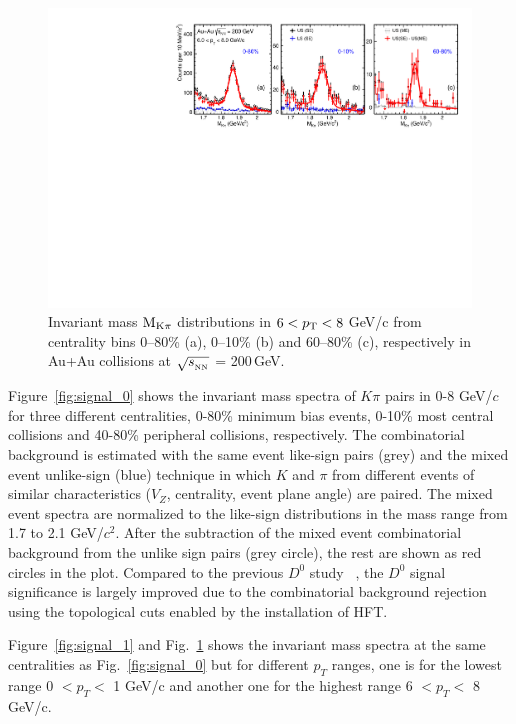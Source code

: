 \documentclass[%
 reprint,	
 amsmath,amssymb,
 aps,
 prc,
]{revtex4-1}
\begin{document}
\begin{figure}
\centering
\includegraphics[width=1.0\textwidth]{fig/signal_6_8GeV.pdf}
\caption{Invariant mass $\rm M_{K\pi}$ distributions in $6 < p_{\rm T} < 8$ GeV/c from centrality bins 0--80\% (a), 0--10\% (b) and 60--80\% (c), respectively in Au+Au collisions at $\sqrt{s_{_{\rm NN}}}$ = 200\,GeV.}
\label{fig:signal_2} 
\end{figure}

Figure~\ref{fig:signal_0} shows the invariant mass spectra of $K\pi$ pairs in 0-8 GeV/$c$ for three different centralities, 0-80\% minimum bias events, 0-10\% most central collisions and 40-80\% peripheral collisions, respectively. The combinatorial background is estimated with the same event like-sign pairs (grey) and the mixed event unlike-sign (blue) technique in which $K$ and $\pi$ from different events of similar characteristics ($V_{Z}$, centrality, event plane angle) are paired. The mixed event spectra are normalized to the like-sign distributions in the mass range from 1.7 to 2.1 GeV/$c^2$. After the subtraction of the mixed event combinatorial background from the unlike sign pairs (grey circle), the rest are shown as red circles in the plot. Compared to the previous $D^0$ study ~\cite{Star_D_RAA}, the $D^0$ signal significance is largely improved due to the combinatorial background rejection using the topological cuts enabled by the installation of HFT. 

Figure~\ref{fig:signal_1} and Fig.~\ref{fig:signal_2} shows the invariant mass spectra at the same centralities as Fig.~\ref{fig:signal_0} but for different $p_T$ ranges, one is for the lowest range 0 $< p_T <$ 1 GeV/c and another one for the highest range 6 $< p_T <$ 8 GeV/c.
\end{document}
